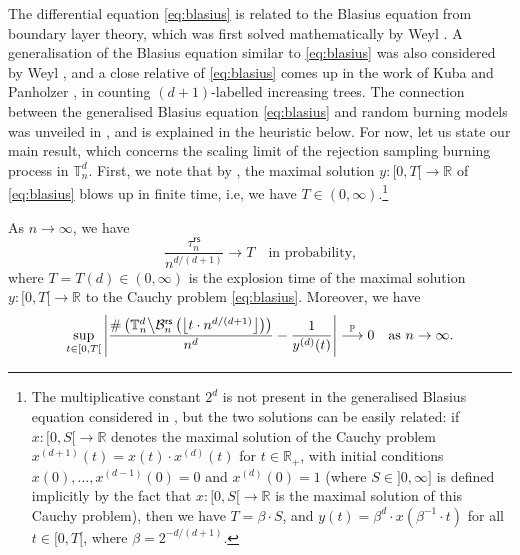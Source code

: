 \documentclass[a4paper,11pt]{article}
\begin{document}
The differential equation \eqref{eq:blasius} is related to the Blasius equation from boundary layer theory, which was first solved mathematically by Weyl \cite{weyl}.
A generalisation of the Blasius equation similar to \eqref{eq:blasius} was also considered by Weyl \cite[Section 3]{weyl}, and a close relative of \eqref{eq:blasius} comes up in the work of Kuba and Panholzer \cite[Subsection 2.6, Equation (5)]{kubapanholzer}, in counting $(d+1)$-labelled increasing trees.
The connection between the generalised Blasius equation \eqref{eq:blasius} and random burning models was unveiled in \cite{blasius}, and is explained in the heuristic below.
For now, let us state our main result, which concerns the scaling limit of the rejection sampling burning process in $\mathbb{T}_n^d$.
First, we note that by \cite[Theorem 1]{blasius}, the maximal solution $y:{[0,T[}\rightarrow\mathbb{R}$ of \eqref{eq:blasius} blows up in finite time, i.e, we have $T\in(0,\infty)$.\footnote{The multiplicative constant $2^d$ is not present in the generalised Blasius equation considered in \cite{blasius}, but the two solutions can be easily related: if $x:{[0,S[}\rightarrow\mathbb{R}$ denotes the maximal solution of the Cauchy problem $x^{(d+1)}(t)=x(t)\cdot x^{(d)}(t)$ for $t\in\mathbb{R}_+$, with initial conditions $x(0),\ldots,x^{(d-1)}(0)=0$ and $x^{(d)}(0)=1$ (where $S\in{]0,\infty]}$ is defined implicitly by the fact that $x:{[0,S[}\rightarrow\mathbb{R}$ is the maximal solution of this Cauchy problem), then we have $T=\beta\cdot S$, and $y(t)=\beta^d\cdot x\left(\beta^{-1}\cdot t\right)$ for all $t\in[0,T[$, where $\beta=2^{-d/(d+1)}$.}

\begin{thm}\label{thm:rejectionsampling}
As $n\to\infty$, we have
\begin{equation}\label{eq:asymptoticrandomburning}
\frac{\tau_n^\mathsf{rs}}{n^{d/(d+1)}}\longrightarrow T\quad\text{in probability,}
\end{equation}
where $T=T(d)\in(0,\infty)$ is the explosion time of the maximal solution $y:{[0,T[}\rightarrow\mathbb{R}$ to the Cauchy problem \eqref{eq:blasius}.
Moreover, we have
\begin{equation}\label{eq:functionalconvergence}
\sup_{t\in[0,T[}\left|\frac{\#\left(\mathbb{T}_n^d\middle\backslash\mathcal{B}_n^\mathsf{rs}\left(\left\lfloor t\cdot n^{d/(d+1)}\right\rfloor\right)\right)}{n^d}-\frac{1}{y^{(d)}(t)}\right|\overset{\mathbb{P}}{\longrightarrow}0\quad\text{as $n\to\infty$.}
\end{equation}
\end{thm}
\end{document}
